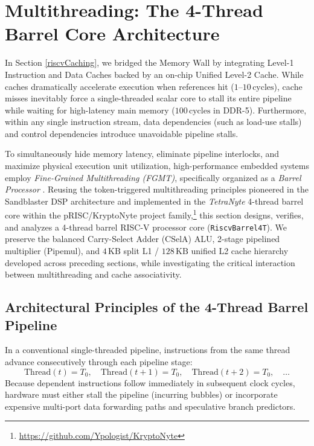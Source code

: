 
\section{Multithreading: The 4-Thread Barrel Core Architecture}\label{riscvMultithreading}

In Section \ref{riscvCaching}, we bridged the Memory Wall by integrating Level-1 Instruction and Data Caches backed by an on-chip Unified Level-2 Cache. While caches dramatically accelerate execution when references hit ($1\text{--}10\,\text{cycles}$), cache misses inevitably force a single-threaded scalar core to stall its entire pipeline while waiting for high-latency main memory ($100\,\text{cycles}$ in DDR-5). Furthermore, within any single instruction stream, data dependencies (such as load-use stalls) and control dependencies introduce unavoidable pipeline stalls.

To simultaneously hide memory latency, eliminate pipeline interlocks, and maximize physical execution unit utilization, high-performance embedded systems employ \textit{Fine-Grained Multithreading (FGMT)}, specifically organized as a \textit{Barrel Processor} \cite{smith1978hep,alverson1990tera,glossner2003sandblaster}. Reusing the token-triggered multithreading principles pioneered in the Sandblaster DSP architecture \cite{glossner2003sandblaster} and implemented in the \textit{TetraNyte} 4-thread barrel core within the pRISC/KryptoNyte project family,\footnote{\url{https://github.com/Ypologist/KryptoNyte}} this section designs, verifies, and analyzes a 4-thread barrel RISC-V processor core (\texttt{RiscvBarrel4T}). We preserve the balanced Carry-Select Adder (CSelA) ALU, 2-stage pipelined multiplier (Pipemul), and $4\,\text{KB}$ split L1 / $128\,\text{KB}$ unified L2 cache hierarchy developed across preceding sections, while investigating the critical interaction between multithreading and cache associativity.


\subsection{Architectural Principles of the 4-Thread Barrel Pipeline}

In a conventional single-threaded pipeline, instructions from the same thread advance consecutively through each pipeline stage:
\begin{equation}
\text{Thread}(t) = T_0, \quad \text{Thread}(t+1) = T_0, \quad \text{Thread}(t+2) = T_0, \quad \dots
\end{equation}
Because dependent instructions follow immediately in subsequent clock cycles, hardware must either stall the pipeline (incurring bubbles) or incorporate expensive multi-port data forwarding paths and speculative branch predictors.

